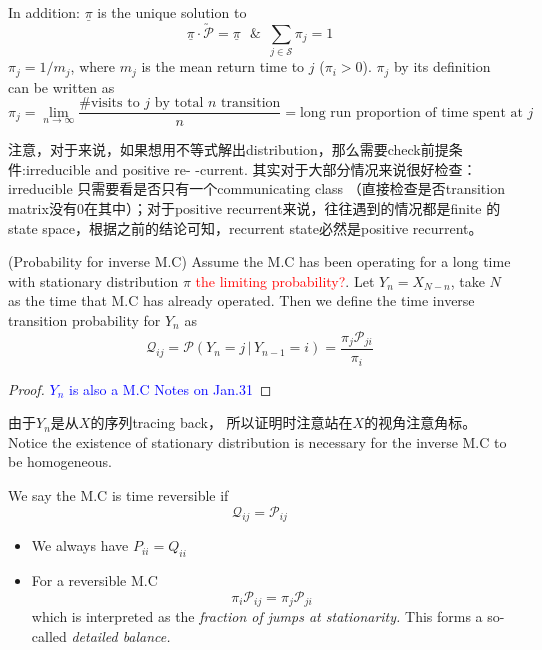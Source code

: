 \documentclass[10.5pt]{article}
\newcommand*\circled[1]{\tikz[baseline=(char.base)]{
            \node[shape=circle,draw,inner sep=2pt] (char) {#1};}}
\newcommand{\transmtx}[0]{\utilde{\mathcal{P}}}
\newcommand{\prob}[0]{\mathcal{P}}
\newcommand{\hilight}[1]{\colorbox{orange!20}{#1}}
\newenvironment{changemargin}[2]{%
  \begin{list}{}{%
    \setlength{\topsep}{0pt}%
    \setlength{\leftmargin}{#1}%
    \setlength{\rightmargin}{#2}%
    \setlength{\listparindent}{\parindent}%
    \setlength{\itemindent}{\parindent}%
    \setlength{\parsep}{\parskip}%
  }%
  \item[]}{\end{list}}
\begin{document}
\begin{changemargin}{-0.125in}{0in}
\begin{enumerate}
        In addition: \circled{1} $\underline{\pi}$ is the unique solution to 
        \[
        \underline{\pi} \cdot \transmtx = \underline{\pi}\,\,\,\,\&\,\,\,\sum_{j \in \mathcal{S}}\pi_j = 1
        \]
         \circled{2} $\pi_j = 1/m_j$, where $m_j$ is the mean return time to $j$ ($\pi_i>0$). \circled{3} $\pi_j$ by its definition can be written as 
         \[
         \pi_j = \lim_{n\rightarrow \infty} \frac{\# \text{visits to $j$ by total $n$ transition}}{n} = \text{long run proportion of time spent at $j$}
         \]        
      
        注意，对于\circled{1}来说，如果想用不等式解出distribution，那么需要check前提条件:\hilight{irreducible and positive re-} \hilight{-current.} 其实对于大部分情况来说很好检查：irreducible 只需要看是否只有一个communicating class （直接检查是否transition matrix没有0在其中）；对于positive recurrent来说，往往遇到的情况都是finite 的 state space，根据之前的结论可知，recurrent state必然是positive recurrent。
        
        \begin{definition} (Probability for inverse M.C) Assume the M.C has been operating for a long time with stationary distribution $\pi$ \textcolor{red}{the limiting probability?}. Let $Y_n = X_{N-n}$, take $N$ as the time that M.C has already operated. Then we define the time inverse transition probability for $Y_n$ as
        \[
        \mathcal{Q}_{ij} = \prob(Y_n = j\,|\,Y_{n-1} = i) = \frac{\pi_j \prob_{ji}}{\pi_{i}}
        \]	
        \end{definition}
       
       \begin{proof}
       	\textcolor{blue}{$Y_n$ is also a M.C Notes on Jan.31}
       \end{proof}
       由于$Y_n$是从$X$的序列tracing back， 所以证明时注意站在$X$的视角注意角标。Notice the existence of stationary distribution is necessary for the inverse M.C to be homogeneous. 
       
       \begin{definition}
       	We say the M.C is time reversible if 
       	\[
       	\mathcal{Q}_{ij} = \mathcal{P}_{ij}
       	\]
       \end{definition}
       
       \begin{remark}
       	 \begin{itemize}
       	 	\item
         	 We always have $P_{ii} = Q_{ii}$
         	 \item For a reversible M.C 
         	 \[
         	 \pi_i \prob_{ij} =\pi_j \prob_{ji}
         	 \]
         	 which is interpreted as the \textit{fraction of jumps at stationarity.} This forms a so-called \textit{detailed balance.}
         \end{itemize}
       \end{remark}
       

\end{enumerate}
\end{changemargin}
\end{document}
